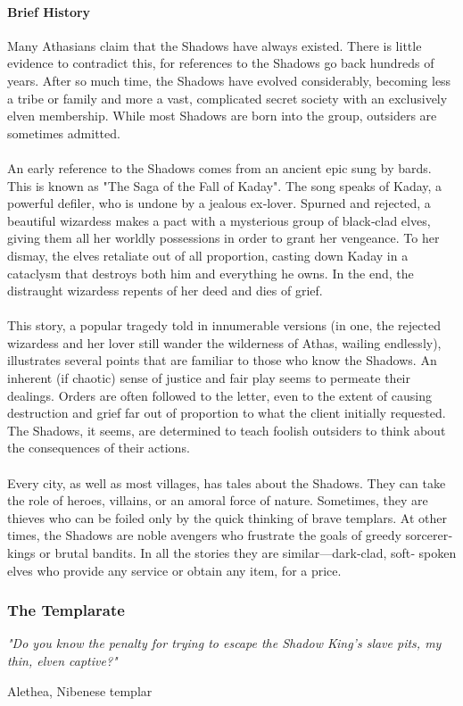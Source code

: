 \begin{multicols}{2}
\paragraph{Brief History}
Many Athasians claim that the Shadows have always
existed. There is little evidence to contradict this, for
references to the Shadows go back hundreds of years.
After so much time, the Shadows have evolved
considerably, becoming less a tribe or family and more a
vast, complicated secret society with an exclusively elven
membership. While most Shadows are born into the
group, outsiders are sometimes admitted.\\
\\
An early reference to the Shadows comes from an
ancient epic sung by bards. This is known as "The Saga of
the Fall of Kaday". The song speaks of Kaday, a powerful
defiler, who is undone by a jealous ex‐lover. Spurned and
rejected, a beautiful wizardess makes a pact with a
mysterious group of black‐clad elves, giving them all her
worldly possessions in order to grant her vengeance. To
her dismay, the elves retaliate out of all proportion,
casting down Kaday in a cataclysm that destroys both
him and everything he owns. In the end, the distraught
wizardess repents of her deed and dies of grief.\\
\\
This story, a popular tragedy told in innumerable
versions (in one, the rejected wizardess and her lover still
wander the wilderness of Athas, wailing endlessly),
illustrates several points that are familiar to those who
know the Shadows. An inherent (if chaotic) sense of
justice and fair play seems to permeate their dealings.
Orders are often followed to the letter, even to the extent
of causing destruction and grief far out of proportion to
what the client initially requested. The Shadows, it seems,
are determined to teach foolish outsiders to think about
the consequences of their actions.\\
\\
Every city, as well as most villages, has tales about the
Shadows. They can take the role of heroes, villains, or an
amoral force of nature. Sometimes, they are thieves who
can be foiled only by the quick thinking of brave templars.
At other times, the Shadows are noble avengers who
frustrate the goals of greedy sorcerer‐kings or brutal
bandits. In all the stories they are similar—dark‐clad, soft‐
spoken elves who provide any service or obtain any item,
for a price.

\subsubsection{The Templarate}
\epigraph{\textit{
"Do you know the penalty for trying to escape the Shadow
King’s slave pits, my thin, elven captive?" }}
{ Alethea, Nibenese templar }


\end{multicols}
